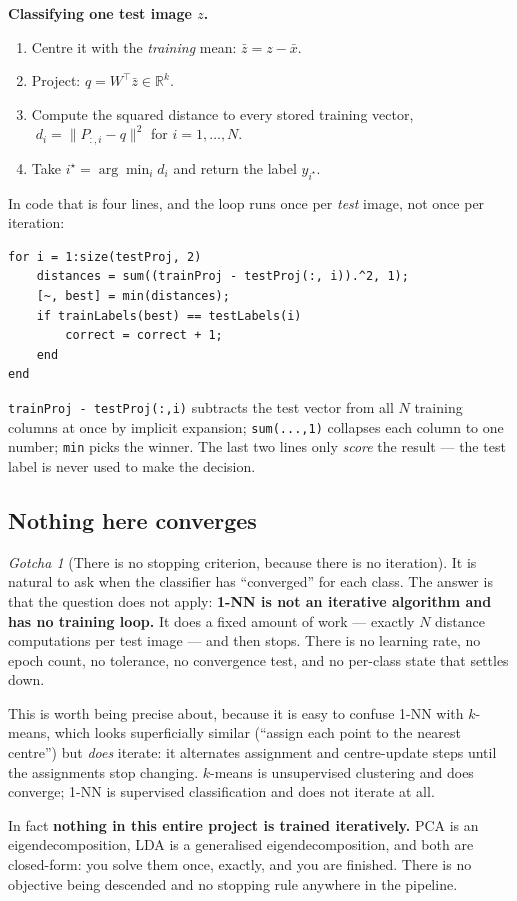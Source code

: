 \documentclass[11pt]{article}
\theoremstyle{definition}
\theoremstyle{remark}
\newtheorem*{gotcha}{Gotcha}
\newcommand{\R}{\mathbb{R}}
\begin{document}
\textbf{Classifying one test image $z$.}
\begin{enumerate}[nosep,leftmargin=*]
\item Centre it with the \emph{training} mean: $\bar{z} = z - \bar{x}$.
\item Project: $q = W^{\!\top}\bar{z} \in \R^{k}$.
\item Compute the squared distance to every stored training vector,
      $\;d_i = \|P_{:,i} - q\|^2$ for $i=1,\dots,N$.
\item Take $i^\star = \arg\min_i d_i$ and return the label $y_{i^\star}$.
\end{enumerate}

In code that is four lines, and the loop runs once per \emph{test} image, not
once per iteration:
\begin{lstlisting}
for i = 1:size(testProj, 2)
    distances = sum((trainProj - testProj(:, i)).^2, 1);
    [~, best] = min(distances);
    if trainLabels(best) == testLabels(i)
        correct = correct + 1;
    end
end
\end{lstlisting}
\texttt{trainProj - testProj(:,i)} subtracts the test vector from all $N$ training
columns at once by implicit expansion; \texttt{sum(...,1)} collapses each column
to one number; \texttt{min} picks the winner. The last two lines only
\emph{score} the result --- the test label is never used to make the decision.

\subsection{Nothing here converges}

\begin{gotcha}[There is no stopping criterion, because there is no iteration]
It is natural to ask when the classifier has ``converged'' for each class. The
answer is that the question does not apply: \textbf{1-NN is not an iterative
algorithm and has no training loop.} It does a fixed amount of work --- exactly
$N$ distance computations per test image --- and then stops. There is no learning
rate, no epoch count, no tolerance, no convergence test, and no per-class state
that settles down.

This is worth being precise about, because it is easy to confuse 1-NN with
$k$-means, which looks superficially similar (``assign each point to the nearest
centre'') but \emph{does} iterate: it alternates assignment and centre-update
steps until the assignments stop changing. $k$-means is unsupervised clustering
and does converge; 1-NN is supervised classification and does not iterate at all.

In fact \textbf{nothing in this entire project is trained iteratively.} PCA is an
eigendecomposition, LDA is a generalised eigendecomposition, and both are
closed-form: you solve them once, exactly, and you are finished. There is no
objective being descended and no stopping rule anywhere in the pipeline.
\end{gotcha}
\end{document}
